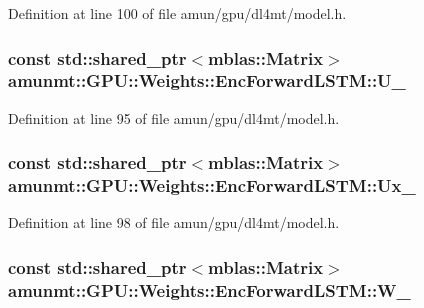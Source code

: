 Definition at line 100 of file amun/gpu/dl4mt/model.\+h.

\subsubsection[{\texorpdfstring{U\+\_\+}{U_}}]{\setlength{\rightskip}{0pt plus 5cm}const std\+::shared\+\_\+ptr$<${\bf mblas\+::\+Matrix}$>$ amunmt\+::\+G\+P\+U\+::\+Weights\+::\+Enc\+Forward\+L\+S\+T\+M\+::\+U\+\_\+}\hypertarget{structamunmt_1_1GPU_1_1Weights_1_1EncForwardLSTM_adb63ed5dfd9130e558d4b3fd0db233a5}{}\label{structamunmt_1_1GPU_1_1Weights_1_1EncForwardLSTM_adb63ed5dfd9130e558d4b3fd0db233a5}


Definition at line 95 of file amun/gpu/dl4mt/model.\+h.

\subsubsection[{\texorpdfstring{Ux\+\_\+}{Ux_}}]{\setlength{\rightskip}{0pt plus 5cm}const std\+::shared\+\_\+ptr$<${\bf mblas\+::\+Matrix}$>$ amunmt\+::\+G\+P\+U\+::\+Weights\+::\+Enc\+Forward\+L\+S\+T\+M\+::\+Ux\+\_\+}\hypertarget{structamunmt_1_1GPU_1_1Weights_1_1EncForwardLSTM_a82da9f93bccbbec2b8a60e7790605c33}{}\label{structamunmt_1_1GPU_1_1Weights_1_1EncForwardLSTM_a82da9f93bccbbec2b8a60e7790605c33}


Definition at line 98 of file amun/gpu/dl4mt/model.\+h.

\subsubsection[{\texorpdfstring{W\+\_\+}{W_}}]{\setlength{\rightskip}{0pt plus 5cm}const std\+::shared\+\_\+ptr$<${\bf mblas\+::\+Matrix}$>$ amunmt\+::\+G\+P\+U\+::\+Weights\+::\+Enc\+Forward\+L\+S\+T\+M\+::\+W\+\_\+}\hypertarget{structamunmt_1_1GPU_1_1Weights_1_1EncForwardLSTM_ae060a7cccb84159acd1a04a942c1807c}{}\label{structamunmt_1_1GPU_1_1Weights_1_1EncForwardLSTM_ae060a7cccb84159acd1a04a942c1807c}


